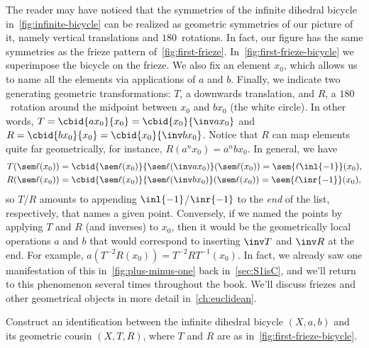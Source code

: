 \begin{remark}\label{rem:inf-dihedral-frieze}
  The reader may have noticed that the symmetries of the
  infinite dihedral bicycle in~\cref{fig:infinite-bicycle}
  can be realized as geometric symmetries of our picture of it,
  namely vertical translations and $180$\textdegree\ rotations.
  In fact, our figure has the same symmetries as the frieze pattern
  of~\cref{fig:first-frieze}.
  In~\cref{fig:first-frieze-bicycle} we superimpose the bicycle on
  the frieze. We also fix an element $x_0$, which allows
  us to name all the elements via applications of $a$ and $b$.
  Finally, we indicate two generating geometric transformations:
  $T$, a downwards translation, and $R$, a $180$\textdegree\ rotation
  around the midpoint between $x_0$ and $bx_0$ (the white circle).
  In other words, $T = \cbid{ax_0}{x_0} = \cbid{x_0}{\inv ax_0}$
  and $R = \cbid{bx_0}{x_0} = \cbid{x_0}{\inv bx_0}$.
  Notice that $R$ can map elements quite far geometrically,
  for instance, $R(a^nx_0) = a^nbx_0$.
  In general, we have
  \begin{align*}
    T(\sem\ell(x_0)) &= \cbid{\sem\ell(x_0)}{\sem\ell(\inv ax_0)}(\sem\ell(x_0))
                       = \sem{\ell \inl{-1}}(x_0),\\
    R(\sem\ell(x_0)) &= \cbid{\sem\ell(x_0)}{\sem\ell(\inv bx_0)}(\sem\ell(x_0))
                       = \sem{\ell \inr{-1}}(x_0),
  \end{align*}
  so $T$/$R$ amounts to appending $\inl{-1}$/$\inr{-1}$ to the \emph{end} of the list,
  respectively, that names a given point.
  Conversely, if we named the points by applying $T$ and $R$ (and inverses)
  to $x_0$, then it would be the geometrically local operations $a$ and $b$
  that would correspond to inserting $\inv T$ and $\inv R$ at the end.
  For example, $a(T^{-2}R(x_0)) = T^{-2}RT^{-1}(x_0)$.
  In fact, we already saw one manifestation of this
  in~\cref{fig:plus-minus-one} back in~\cref{sec:S1isC},
  and we'll return to this phenomenon several times throughout the book.
  We'll discuss friezes and other geometrical objects in
  more detail in~\cref{ch:euclidean}.
\end{remark}
\begin{xca}
  Construct an identification between the infinite dihedral bicycle
  $(X,a,b)$ and its geometric cousin $(X,T,R)$, where
  $T$ and $R$ are as in~\cref{fig:first-frieze-bicycle}.
\end{xca}

